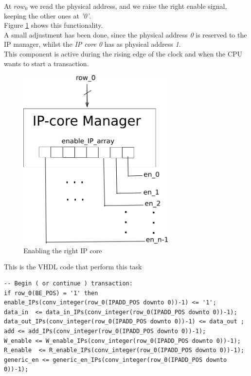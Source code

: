 At $ row_0 $ we read the physical address, and we raise the right enable signal, keeping the other ones at \textit{'0'}.\\
Figure \ref{fig:en_IP} shows this functionality.\\
\bigskip
A small adjustment has been done, since the physical address \textit{0} is reserved to the IP manager, whilst the  \textit{IP core 0 } has as physical address \textit{1}.\\
\bigskip
This component is active during the rising edge of the clock and when the CPU wants to start a transaction.
\begin{figure}[h!]
	\centering	
	\includegraphics[width=0.7\textwidth]{imm/ip_func/enable_ip.png}  
	\caption{Enabling the right IP core} 
	\label{fig:en_IP}
\end{figure}
\bigskip
This is the VHDL code that perform this task
\begin{lstlisting}
-- Begin ( or continue ) transaction:
if row_0(BE_POS) = '1' then											
enable_IPs(conv_integer(row_0(IPADD_POS downto 0))-1) <= '1';
data_in  <= data_in_IPs(conv_integer(row_0(IPADD_POS downto 0))-1);
data_out_IPs(conv_integer(row_0(IPADD_POS downto 0))-1) <= data_out ;
add <= add_IPs(conv_integer(row_0(IPADD_POS downto 0))-1);
W_enable <= W_enable_IPs(conv_integer(row_0(IPADD_POS downto 0))-1);
R_enable  <= R_enable_IPs(conv_integer(row_0(IPADD_POS downto 0))-1);
generic_en <= generic_en_IPs(conv_integer(row_0(IPADD_POS downto 0))-1);																		

\end{lstlisting}
\clearpage
